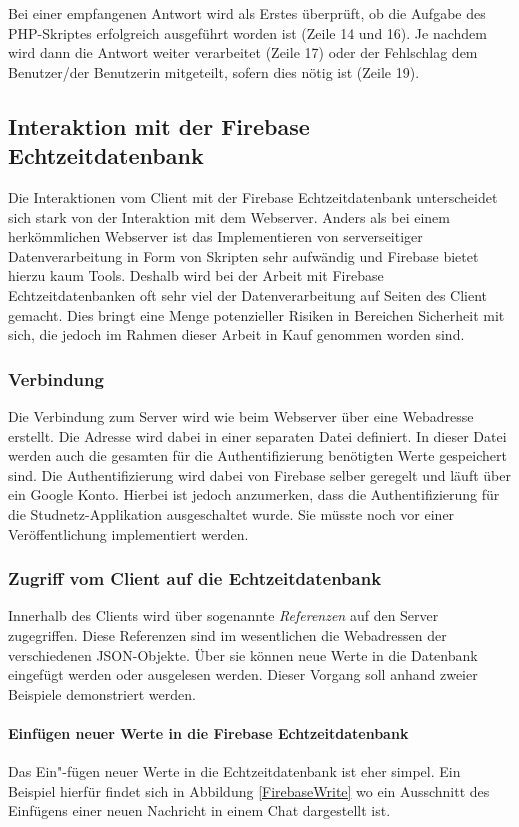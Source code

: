 \documentclass[../main.tex]{subfiles}
\begin{document}
	Bei einer empfangenen Antwort wird als Erstes überprüft, ob die Aufgabe des PHP-Skriptes erfolgreich ausgeführt worden ist (Zeile 14 und 16). Je nachdem wird dann die Antwort weiter verarbeitet (Zeile 17) oder der Fehlschlag dem Benutzer/der Benutzerin mitgeteilt, sofern dies nötig ist (Zeile 19).
	
	\subsection{Interaktion mit der Firebase Echtzeitdatenbank}
	Die Interaktionen vom Client mit der Firebase Echtzeitdatenbank unterscheidet sich stark von der Interaktion mit dem Webserver. Anders als bei einem herkömmlichen Webserver ist das Implementieren von serverseitiger Datenverarbeitung in Form von Skripten sehr aufwändig und Firebase bietet hierzu kaum Tools. Deshalb wird bei der Arbeit mit Firebase Echtzeitdatenbanken oft sehr viel der Datenverarbeitung auf Seiten des Client gemacht. Dies bringt eine Menge potenzieller Risiken in Bereichen Sicherheit mit sich, die jedoch im Rahmen dieser Arbeit in Kauf genommen worden sind. 
	
	\subsubsection{Verbindung}
	Die Verbindung zum Server wird wie beim Webserver über eine Webadresse erstellt. Die Adresse wird dabei in einer separaten Datei definiert. In dieser Datei werden auch die gesamten für die Authentifizierung benötigten Werte gespeichert sind. Die Authentifizierung wird dabei von Firebase selber geregelt und läuft über ein Google Konto. Hierbei ist jedoch anzumerken, dass die Authentifizierung für die Studnetz-Applikation ausgeschaltet wurde. Sie müsste noch vor einer Veröffentlichung implementiert werden.
	
	\subsubsection{Zugriff vom Client auf die Echtzeitdatenbank}
	Innerhalb des Clients wird über sogenannte \emph{Referenzen} auf den Server zugegriffen. Diese Referenzen sind im wesentlichen die Webadressen der verschiedenen JSON-Objekte. Über sie können neue Werte in die Datenbank eingefügt werden oder ausgelesen werden. Dieser Vorgang soll anhand zweier Beispiele demonstriert werden.
	
	\paragraph{Einfügen neuer Werte in die Firebase Echtzeitdatenbank}
	Das Ein"-fügen neuer Werte in die Echtzeitdatenbank ist eher simpel. Ein Beispiel hierfür findet sich in Abbildung \ref{FirebaseWrite} wo ein Ausschnitt des Einfügens einer neuen Nachricht in einem Chat dargestellt ist.
\end{document}
